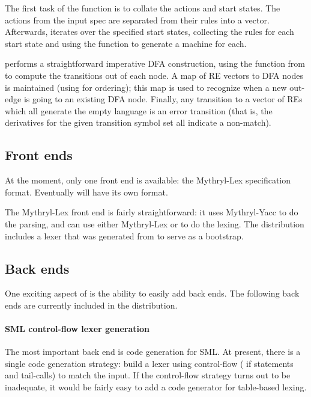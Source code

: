 The first task of the  function is to collate the actions and start
states.  The actions from the input spec are separated from their rules into a
vector.  Afterwards,  iterates over the specified start states,
collecting the rules for each start state and using the  function to
generate a machine for each.

 performs a straightforward imperative DFA construction, using
the  function from  to compute the transitions out of
each node. A map of RE vectors to DFA nodes is maintained (using
 for ordering); this map is used to recognize
when a new out-edge is going to an existing DFA node.  Finally, any transition
to a vector of REs which all generate the empty language is an error transition
(that is, the derivatives for the given transition symbol set all indicate a
non-match).

\subsection{Front ends}

At the moment, only one front end is available: the Mythryl-Lex specification
format.  Eventually \flex{} will have its own format.

The Mythryl-Lex front end is fairly straightforward: it uses Mythryl-Yacc to do the
parsing, and can use either Mythryl-Lex or \flex{} to do the lexing.  The
distribution includes a lexer that was generated from \flex{} to serve as a
bootstrap.

\subsection{Back ends}

One exciting aspect of \flex{} is the ability to easily add back ends.  The
following back ends are currently included in the distribution.

\paragraph{SML control-flow lexer generation}

The most important back end is code generation for SML.  At present, there is a
single code generation strategy: build a lexer using control-flow (\ie
if statements and tail-calls) to match the input.  If the control-flow strategy
turns out to be inadequate, it would be fairly easy to add a code
generator for table-based lexing.

